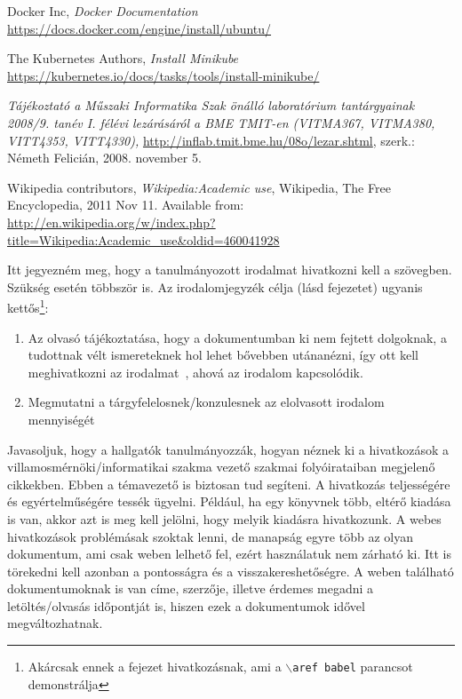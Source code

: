 \documentclass[a4paper,oneside]{article}
\begin{document}
\begin{thebibliography}{9}
  Docker Inc, \emph{Docker Documentation}
\\ \url{https://docs.docker.com/engine/install/ubuntu/}

 The Kubernetes Authors, \emph{Install Minikube}
\\ \url{https://kubernetes.io/docs/tasks/tools/install-minikube/}

 \emph{Tájékoztató a Műszaki Informatika Szak önálló
    laboratórium tantárgyainak 2008/9. tanév I. félévi lezárásáról a
    BME TMIT-en (VITMA367, VITMA380, VITT4353, VITT4330),}
  \url{http://inflab.tmit.bme.hu/08o/lezar.shtml}, szerk.: Németh Felicián,
  2008. november 5.

 Wikipedia contributors, \emph{Wikipedia:Academic
    use}, Wikipedia, The Free Encyclopedia, 2011 Nov 11.  Available
  from: \\ \url{http://en.wikipedia.org/w/index.php?title=Wikipedia:Academic\_use\&oldid=460041928}

\end{thebibliography}

Itt jegyezném meg, hogy a tanulmányozott irodalmat hivatkozni kell a
szövegben.  Szükség esetén többször is.  Az irodalomjegyzék célja
(lásd  fejezetet) ugyanis
kettős\footnote{Akárcsak ennek a fejezet hivatkozásnak, ami a
  \texttt{$\backslash$aref babel} parancsot demonstrálja}:
\begin{enumerate}
\item Az olvasó tájékoztatása, hogy a dokumentumban ki nem fejtett
  dolgoknak, a tudottnak vélt ismereteknek hol lehet bővebben
  utánanézni, így ott kell meghivatkozni az irodalmat~\cite{eco,
    esterhazy}, ahová az irodalom kapcsolódik.
\item Megmutatni a tárgyfelelosnek/konzulesnek az elolvasott irodalom
  mennyiségét
\end{enumerate}

Javasoljuk, hogy a hallgatók tanulmányozzák, hogyan néznek ki a
hivatkozások a villamosmérnöki/informatikai szakma vezető szakmai
folyóirataiban megjelenő cikkekben.  Ebben a témavezető is biztosan
tud segíteni.  A hivatkozás teljességére és egyértelműségére tessék
ügyelni.  Például, ha egy könyvnek több, eltérő kiadása is van, akkor
azt is meg kell jelölni, hogy melyik kiadásra hivatkozunk.  A webes
hivatkozások problémásak szoktak lenni, de manapság egyre több az
olyan dokumentum, ami csak weben lelhető fel, ezért használatuk nem
zárható ki. Itt is törekedni kell azonban a pontosságra és a
visszakereshetőségre. A weben található dokumentumoknak is van címe,
szerzője, illetve érdemes megadni a letöltés/olvasás időpontját is,
hiszen ezek a dokumentumok idővel megváltozhatnak.
\end{document}
